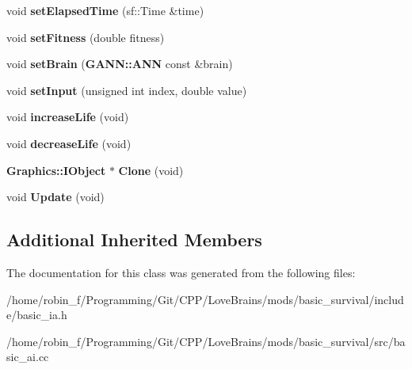 \begin{DoxyCompactItemize}
\item 
void {\bfseries set\+Elapsed\+Time} (sf\+::\+Time \&time)\label{class_basic_a_i_a974ccf56612fa486d7c0b886c273edfd}

\item 
void {\bfseries set\+Fitness} (double fitness)\label{class_basic_a_i_aded3cdf2c30ea7465421f5824749ab58}

\item 
void {\bfseries set\+Brain} ({\bf G\+A\+N\+N\+::\+A\+N\+N} const \&brain)\label{class_basic_a_i_a5767c288c5b67e12911111b2ee81dc68}

\item 
void {\bfseries set\+Input} (unsigned int index, double value)\label{class_basic_a_i_ad0282057714372cfb26624a249937fc1}

\item 
void {\bfseries increase\+Life} (void)\label{class_basic_a_i_a344dcae800ad0959b259888b3534a7c2}

\item 
void {\bfseries decrease\+Life} (void)\label{class_basic_a_i_a7c2848663d66ad2ea600dd1f7989395e}

\item 
{\bf Graphics\+::\+I\+Object} $\ast$ {\bfseries Clone} (void)\label{class_basic_a_i_a80c73dc2b39751fd41dad0dba562a9a2}

\item 
void {\bfseries Update} (void)\label{class_basic_a_i_a742e5349916ff3149a234ef69c8b2fce}

\end{DoxyCompactItemize}
\subsection*{Additional Inherited Members}


The documentation for this class was generated from the following files\+:\begin{DoxyCompactItemize}
\item 
/home/robin\+\_\+f/\+Programming/\+Git/\+C\+P\+P/\+Love\+Brains/mods/basic\+\_\+survival/include/basic\+\_\+ia.\+h\item 
/home/robin\+\_\+f/\+Programming/\+Git/\+C\+P\+P/\+Love\+Brains/mods/basic\+\_\+survival/src/basic\+\_\+ai.\+cc\end{DoxyCompactItemize}
